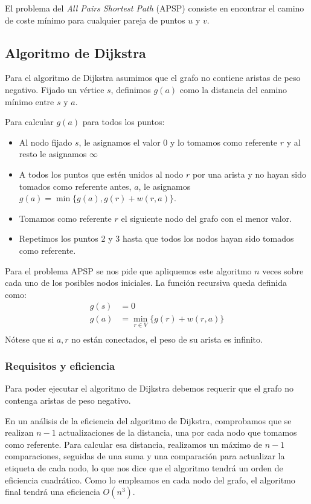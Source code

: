 \documentclass[a4paper, 11pt]{article} %
\begin{document}
    El problema del \textit{All Pairs Shortest Path} (APSP) consiste en encontrar el camino de coste mínimo para cualquier pareja de puntos $u$ y $v$.
    
  \subsection{Algoritmo de Dijkstra}
    Para el algoritmo de Dijkstra asumimos que el grafo no contiene aristas de peso negativo.
    Fijado un vértice $s$, definimos $g(a)$ como la distancia del camino mínimo entre $s$ y $a$.
    
    Para calcular $g(a)$ para todos los puntos:
    \begin{itemize}
      \item Al nodo fijado $s$, le asignamos el valor 0 y lo tomamos como referente $r$ y al resto le asignamos $\infty$
      \item A todos los puntos que estén unidos al nodo $r$  por una
      arista y no hayan sido tomados como referente antes, $a$, le asignamos $g(a) = \min \{g(a), g(r) + w(r,a)\}$.
      \item Tomamos como referente $r$ el siguiente nodo del grafo con el menor valor.
      \item Repetimos los puntos 2 y 3 hasta que todos los nodos hayan sido tomados como referente.
    \end{itemize}
    
    Para el problema APSP se nos pide que apliquemos este algoritmo $n$ veces sobre cada uno
    de los posibles nodos iniciales. La función recursiva queda definida como:
    \begin{equation} 
      \begin{split}
	g(s)  &=  0 \\
	g(a)  &=  \min_{r \in V} \{g(r) + w(r,a)\} \\
      \end{split}
    \end{equation}
    Nótese que si $a,r$ no están conectados, el peso de su arista es infinito.
  
    \subsubsection{Requisitos y eficiencia}
      Para poder ejecutar el algoritmo de Dijkstra debemos requerir que el grafo
      no contenga aristas de peso negativo.
      
      En un análisis de la eficiencia del algoritmo de Dijkstra, comprobamos que se realizan $n-1$ actualizaciones de la distancia, una por cada nodo que tomamos como referente. Para calcular esa distancia, realizamos un máximo de $n-1$ comparaciones, seguidas de una suma y una comparación para actualizar la etiqueta de cada nodo, lo que nos dice que el algoritmo tendrá un orden de eficiencia cuadrático. Como lo empleamos en cada nodo del grafo, el algoritmo final tendrá una eficiencia $O(n^3)$. 
\end{document}
